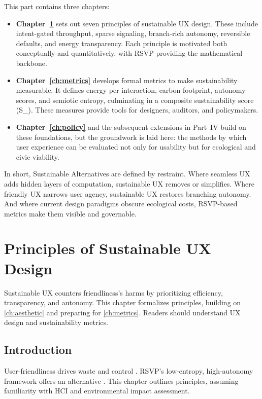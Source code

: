 \documentclass[openany]{book}
\newcommand{\SUX}{S_{\mathrm{UX}}} %
\begin{document}
This part contains three chapters:

\begin{itemize}
  \item \textbf{Chapter~\ref{ch:principles}} sets out seven principles of
  sustainable UX design. These include intent-gated throughput, sparse
  signaling, branch-rich autonomy, reversible defaults, and energy
  transparency. Each principle is motivated both conceptually and
  quantitatively, with RSVP providing the mathematical backbone.

  \item \textbf{Chapter~\ref{ch:metrics}} develops formal metrics to make
  sustainability measurable. It defines energy per interaction, carbon
  footprint, autonomy scores, and semiotic entropy, culminating in a composite
  sustainability score (\SUX). These measures provide tools for designers,
  auditors, and policymakers.

  \item \textbf{Chapter~\ref{ch:policy}} and the subsequent extensions in
  Part~IV build on these foundations, but the groundwork is laid here: the
  methods by which user experience can be evaluated not only for usability but
  for ecological and civic viability.
\end{itemize}

In short, Sustainable Alternatives are defined by restraint. Where seamless UX
adds hidden layers of computation, sustainable UX removes or simplifies. Where
friendly UX narrows user agency, sustainable UX restores branching autonomy.
And where current design paradigms obscure ecological costs, RSVP-based
metrics make them visible and governable.

\chapter{Principles of Sustainable UX Design}
\label{ch:principles}

Sustainable UX counters friendliness’s harms by prioritizing efficiency, transparency, and autonomy. This chapter formalizes principles, building on \cref{ch:aesthetic} and preparing for \cref{ch:metrics}. Readers should understand UX design and sustainability metrics.

\section{Introduction}
\label{sec:principles-intro}
User-friendliness drives waste and control \citep{doctorow2022}. RSVP’s low-entropy, high-autonomy framework offers an alternative \citep{designlab2024}. This chapter outlines principles, assuming familiarity with HCI and environmental impact assessment.
\end{document}
